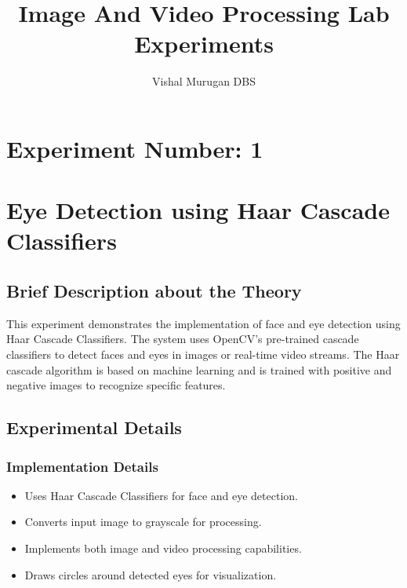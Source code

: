 \documentclass[12pt,a4paper]{article}
\title{Image And Video Processing Lab Experiments}
\author{Vishal Murugan DBS}
\date{}
\begin{document}
\maketitle
\tableofcontents
\newpage

\section*{Experiment Number: 1}
\section {Eye Detection using Haar Cascade Classifiers}

\subsection{Brief Description about the Theory}
This experiment demonstrates the implementation of face and eye detection using Haar Cascade Classifiers. The system uses OpenCV's pre-trained cascade classifiers to detect faces and eyes in images or real-time video streams. The Haar cascade algorithm is based on machine learning and is trained with positive and negative images to recognize specific features.

\subsection{Experimental Details}
\subsubsection{Implementation Details}
\begin{itemize}
  \item Uses Haar Cascade Classifiers for face and eye detection.
  \item Converts input image to grayscale for processing.
  \item Implements both image and video processing capabilities.
  \item Draws circles around detected eyes for visualization.
\end{itemize}
\end{document}
